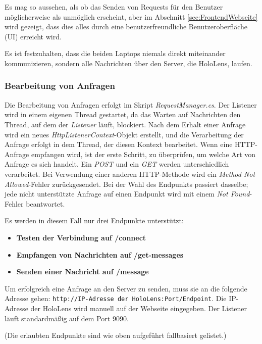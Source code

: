 Es mag so aussehen, als ob das Senden von Requests für den Benutzer möglicherweise als unmöglich erscheint, aber im Abschnitt \ref{sec:FrontendWebseite} wird gezeigt, dass dies alles durch eine benutzerfreundliche Benutzeroberfläche (UI) erreicht wird.

Es ist festzuhalten, dass die beiden Laptops niemals direkt miteinander kommunizieren, sondern alle Nachrichten über den Server, die HoloLens, laufen.

\subsubsection{\label{sec:server}Bearbeitung von Anfragen}
Die Bearbeitung von Anfragen erfolgt im Skript \textit{RequestManager.cs}. Der Listener wird in einem eigenen Thread gestartet, da das Warten auf Nachrichten den Thread, auf dem der \textit{Listener} läuft, blockiert. Nach dem Erhalt einer Anfrage wird ein neues \textit{HttpListenerContext}-Objekt erstellt, und die Verarbeitung der Anfrage erfolgt in dem Thread, der diesen Kontext bearbeitet. Wenn eine HTTP-Anfrage empfangen wird, ist der erste Schritt, zu überprüfen, um welche Art von Anfrage es sich handelt. Ein \textit{POST} und ein \textit{GET} werden unterschiedlich verarbeitet. Bei Verwendung einer anderen HTTP-Methode wird ein \textit{Method Not Allowed}-Fehler zurückgesendet. Bei der Wahl des Endpunkts passiert dasselbe; jede nicht unterstützte Anfrage auf einen Endpunkt wird mit einem \textit{Not Found}-Fehler beantwortet.

Es werden in diesem Fall nur drei Endpunkte unterstützt:

\begin{itemize}
\item \textbf{Testen der Verbindung auf /connect}
\item \textbf{Empfangen von Nachrichten auf /get-messages}
\item \textbf{Senden einer Nachricht auf /message}
\end{itemize}

Um erfolgreich eine Anfrage an den Server zu senden, muss sie an die folgende Adresse
gehen: \texttt{http://{IP-Adresse der HoloLens}:{Port}/{Endpoint}}. Die IP-Adresse der HoloLens wird manuell auf der
Webseite eingegeben. Der Listener läuft standardmäßig auf dem Port 9090.

(Die erlaubten Endpunkte sind wie oben aufgeführt fallbasiert gelistet.)

